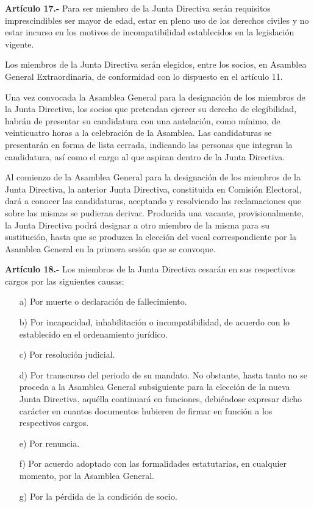 \documentclass[a4paper,12pt]{article}
\begin{document}
\begin{onehalfspace}
\bigskip\bigskip

\textbf{Artículo 17.-} Para ser miembro de la Junta Directiva serán requisitos imprescindibles ser mayor de edad, estar en pleno uso de los derechos civiles y no estar incurso en los motivos de incompatibilidad establecidos en la legislación vigente.

Los miembros de la Junta Directiva serán elegidos, entre los socios, en Asamblea General Extraordinaria, de conformidad con lo dispuesto en el artículo 11.

Una vez convocada la Asamblea General para la designación de los miembros de la Junta Directiva, los socios que pretendan ejercer su derecho de elegibilidad, habrán de presentar su candidatura con una antelación, como mínimo, de veinticuatro horas a la celebración de la Asamblea. Las candidaturas se presentarán en forma de lista cerrada, indicando las personas que integran la candidatura, así como el cargo al que aspiran dentro de la Junta Directiva.

Al comienzo de la Asamblea General para la designación de los miembros de la Junta Directiva, la anterior Junta Directiva, constituida en Comisión Electoral, dará a conocer las candidaturas, aceptando y resolviendo las reclamaciones que sobre las mismas se pudieran derivar. Producida una vacante, provisionalmente, la Junta Directiva podrá designar a otro miembro de la misma para su sustitución, hasta que se produzca la elección del vocal correspondiente por la Asamblea General en la primera sesión que se convoque.

\bigskip\bigskip

\textbf{Artículo 18.-} Los miembros de la Junta Directiva cesarán en sus respectivos cargos por las siguientes causas:
\begin{itemize}
\item [a)] Por muerte o declaración de fallecimiento.
\item [b)] Por incapacidad, inhabilitación o incompatibilidad, de acuerdo con lo establecido en el ordenamiento jurídico.
\item [c)] Por resolución judicial.
\item [d)] Por transcurso del periodo de su mandato. No obstante, hasta tanto no se proceda a la Asamblea General subsiguiente para la elección de la nueva Junta Directiva, aquélla continuará en funciones, debiéndose expresar dicho carácter en cuantos documentos hubieren de firmar en función a los respectivos cargos.
\item [e)] Por renuncia.
\item [f)] Por acuerdo adoptado con las formalidades estatutarias, en cualquier momento, por la Asamblea General.
\item [g)] Por la pérdida de la condición de socio.
\end{itemize}


\end{onehalfspace}
\end{document}
